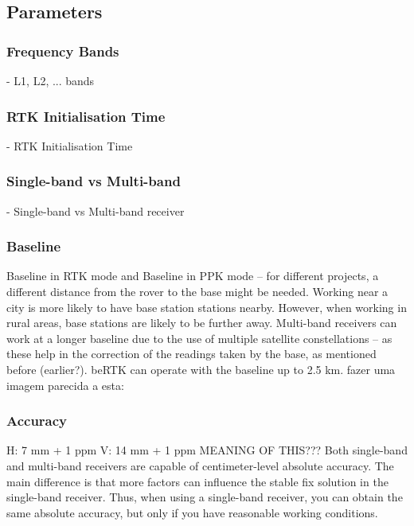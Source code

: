 \subsection{Parameters}\label{sec:II_rtk_parameters}

\subsubsection{Frequency Bands}\label{sec:II_rtk_parameters_freq_bands}
- L1, L2, ... bands

\subsubsection{RTK Initialisation Time}\label{sec:II_rtk_parameters_init_time}

- RTK Initialisation Time

\subsubsection{Single-band vs Multi-band}\label{sec:II_rtk_parameters_s_m_band}

- Single-band vs Multi-band receiver

\subsubsection{Baseline}\label{sec:II_rtk_parameters_baseline}

Baseline in RTK mode and Baseline in PPK mode -- for different projects, a different distance from the rover to the base might be needed. Working near a city is more likely to have base station stations nearby. However, when working in rural areas, base stations are likely to be further away.
Multi-band receivers can work at a longer baseline due to the use of multiple satellite constellations -- as these help in the correction of the readings taken by the base, as mentioned before (earlier?). beRTK can operate with the baseline up to 2.5 km.
fazer uma imagem parecida a esta:

\subsubsection{Accuracy}\label{sec:II_rtk_parameters_accuracy}

H: 7 mm + 1 ppm
V: 14 mm + 1 ppm	MEANING OF THIS???
Both single-band and multi-band receivers are capable of centimeter-level absolute accuracy. The main difference is that more factors can influence the stable fix solution in the single-band receiver. Thus, when using a single-band receiver, you can obtain the same absolute accuracy, but only if you have reasonable working conditions.

